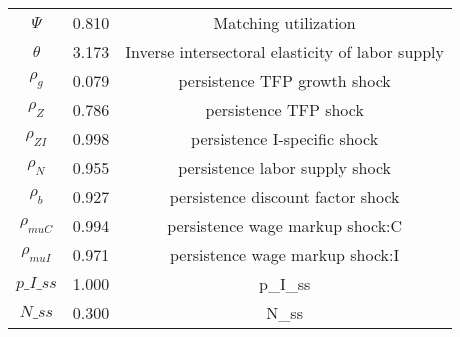 \begin{center}
\begin{longtable}{ccc}
${\Psi}$ 	 & 	 0.810 	 & 	 Matching utilization\\
${\theta}$ 	 & 	 3.173 	 & 	 Inverse intersectoral elasticity of labor supply\\
${\rho_g}$ 	 & 	 0.079 	 & 	 persistence TFP growth shock\\
${\rho_Z}$ 	 & 	 0.786 	 & 	 persistence TFP shock\\
${\rho_{ZI}}$ 	 & 	 0.998 	 & 	 persistence I-specific shock\\
${\rho_N}$ 	 & 	 0.955 	 & 	 persistence labor supply shock\\
${\rho_b}$ 	 & 	 0.927 	 & 	 persistence discount factor shock\\
${\rho_{muC}}$ 	 & 	 0.994 	 & 	 persistence wage markup shock:C\\
${\rho_{muI}}$ 	 & 	 0.971 	 & 	 persistence wage markup shock:I\\
$p\_I\_ss$ 	 & 	 1.000 	 & 	 p\_I\_ss\\
$N\_ss$ 	 & 	 0.300 	 & 	 N\_ss\\
\bottomrule%
\end{longtable}
\end{center}
